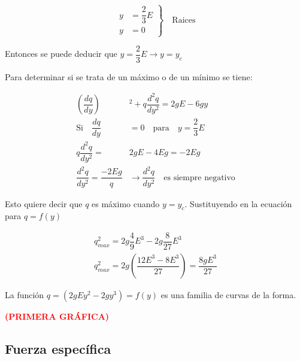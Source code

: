 \documentclass[a4paper, 11pt]{article}
\begin{document}
\begin{equation} 
    \left.\begin{aligned} y&=\dfrac{2}{3}E \\
    y&=0\end{aligned} \right \} \quad \text{Raices} 
\end{equation}

Entonces se puede deducir que $y=\dfrac{2}{3}E\rightarrow y=y_{c}$ \vspace{2ex}

Para determinar si se trata de un máximo o de un mínimo se tiene:

\begin{equation}
    \begin{aligned}
        \left(\dfrac{dq}{dy}\right)&^{2}+q\dfrac{d^{2}q}{dy^{2}}=2gE-6gy \\
        \text{Si} \quad \dfrac{dq}{dy}&=0 \quad \text{para} \quad y=\dfrac{2}{3}E \\
        q\dfrac{d^{2}q}{dy^{2}}=&2gE-4Eg=-2Eg\\
        \dfrac{d^{2}q}{dy^{2}}=\dfrac{-2Eg}{q}&\rightarrow\dfrac{d^{2}q}{dy^{2}} \quad \text{es siempre negativo}
    \end{aligned}
\end{equation}

Esto quiere decir que $q$ es máximo cuando $y=y_{c}$. Sustituyendo en la ecuación para $q=f(y)$ 

\begin{equation}
    \begin{aligned}
        q^{2}_{max}=2g\dfrac{4}{9}E^{3}-2g\dfrac{8}{27}E^{3}\\
        q^{2}_{max}=2g\left(\dfrac{12E^{3}-8E^{3}}{27}\right)=\dfrac{8gE^{3}}{27}
    \end{aligned}  
\end{equation}

La función $q=(2gEy^{2}-2gy^{3})=f(y)$ es una familia de curvas de la forma. \vspace{3ex}


\textcolor{red}{\textbf{(PRIMERA GRÁFICA)}} \vspace{1ex}


\subsection{Fuerza específica}
\end{document}
